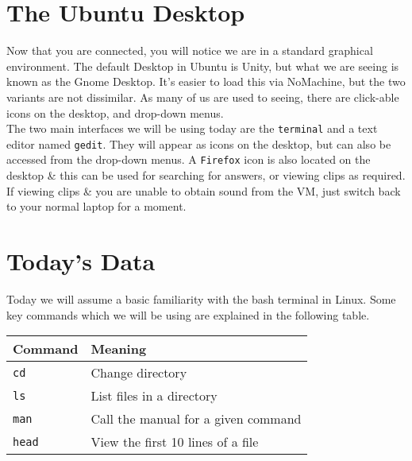 \section{The Ubuntu Desktop}
\begin{note}
Now that you are connected, you will notice we are in a standard graphical environment.
The default Desktop in Ubuntu is Unity, but what we are seeing is known as the Gnome Desktop.
It's easier to load this via NoMachine, but the two variants are not dissimilar.
As many of us are used to seeing, there are click-able icons on the desktop, and drop-down menus. \\

The two main interfaces we will be using today are the \texttt{terminal} and a text editor named \texttt{gedit}.
They will appear as icons on the desktop, but can also be accessed from the drop-down menus.
A \texttt{Firefox} icon is also located on the desktop \& this can be used for searching for answers, or viewing clips as required.
If viewing clips \& you are unable to obtain sound from the VM, just switch back to your normal laptop for a moment.
\end{note}

\section{Today's Data}
\begin{note}
Today we will assume a basic familiarity with the bash terminal in Linux.
Some key commands which we will be using are explained in the following table.
\end{note}
\begin{center}
  \begin{tabular}[h]{|p{3cm} | p{11.5cm} |}
    \hline
    \textbf{Command} & \textbf{Meaning} \\
    \hline
    \texttt{cd} & Change directory \\
    \texttt{ls} & List files in a directory \\
    \texttt{man} & Call the manual for a given command \\
    \texttt{head} & View the first 10 lines of a file \\
    \hline
  \end{tabular}
\end{center}

